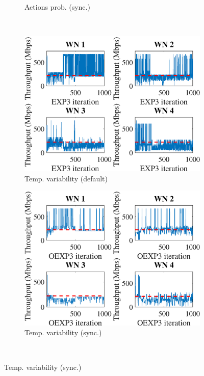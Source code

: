 \documentclass[preprint,12pt]{article}
\begin{document}
\begin{figure}[h!]
\begin{subfigure}[b]{.33\textwidth}
		\caption{Actions prob. (sync.)}\label{fig:actions_probability_OEXP3}
	\end{subfigure}\\
	\begin{subfigure}[b]{.33\textwidth}
		\includegraphics[width=\textwidth]{images/temporal_individual_tpt_EXP3}
		\caption{Temp. variability  (default)}\label{fig:temporal_individual_tpt_EXP3}
	\end{subfigure}
	\begin{subfigure}[b]{.33\textwidth}
		\includegraphics[width=\textwidth]{images/temporal_individual_tpt_OEXP3}
		\caption{Temp. variability  (sync.)}\label{fig:temporal_individual_tpt_OEXP3}
	\end{subfigure}\\

\end{figure}
\end{document}
